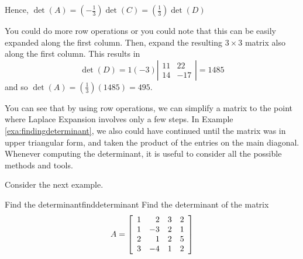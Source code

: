 \begin{solution}
Hence, $\det \left(A\right) = \left(-\frac{1}{3}\right) \det \left( C\right) = \left(\frac{1}{3}\right) \det \left( D\right)$ 

You could do more row operations or you could note that this can be easily
expanded along the first column. Then, expand the resulting $3 \times 3$ matrix
also along the first column. This results in 
\begin{equation*}
\det \left( D\right) =1\left( -3\right) \left\vert
\begin{array}{cc}
11 & 22 \\
14 & -17
\end{array}
\right\vert = 1485
\end{equation*}
and so  $\det \left( A\right) =\left(\frac{1}{3}\right) \left( 1485\right)
=495.$
\end{solution} 

You can see that by using row operations, we can simplify a matrix
to the point where Laplace Expansion involves only a few steps. In Example
\ref{exa:findingdeterminant}, we also could have continued until the matrix was in 
upper triangular form, and taken the product of the entries on the main diagonal. Whenever 
computing the determinant, it is useful to consider all the possible methods and tools.

Consider the next example.

\begin{example}{Find the determinant}{finddeterminant}
Find the determinant of the matrix
\begin{equation*}
A = \left[
\begin{array}{rrrr}
1 & 2 & 3 & 2 \\
1 & -3 & 2 & 1 \\
2 & 1 & 2 & 5 \\
3 & -4 & 1 & 2
\end{array}
\right]
\end{equation*}
\end{example}

